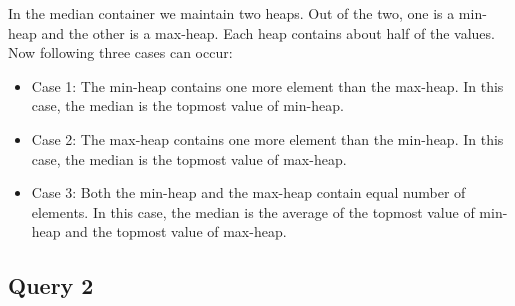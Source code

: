 In the median container we maintain two heaps. Out of the two, one is a min-heap and the other is a max-heap. Each heap contains about half of the values. Now following three cases can occur:
\begin{itemize}
\item Case 1: The min-heap contains one more element than the max-heap. In this case, the median is the topmost value of min-heap.
\item Case 2: The max-heap contains one more element than the min-heap. In this case, the median is the topmost value of max-heap.
\item Case 3: Both the min-heap and the max-heap contain equal number of elements. In this case, the median is the average of the topmost value of min-heap and the topmost value of max-heap.

\end{itemize}

\subsection{Query 2}

